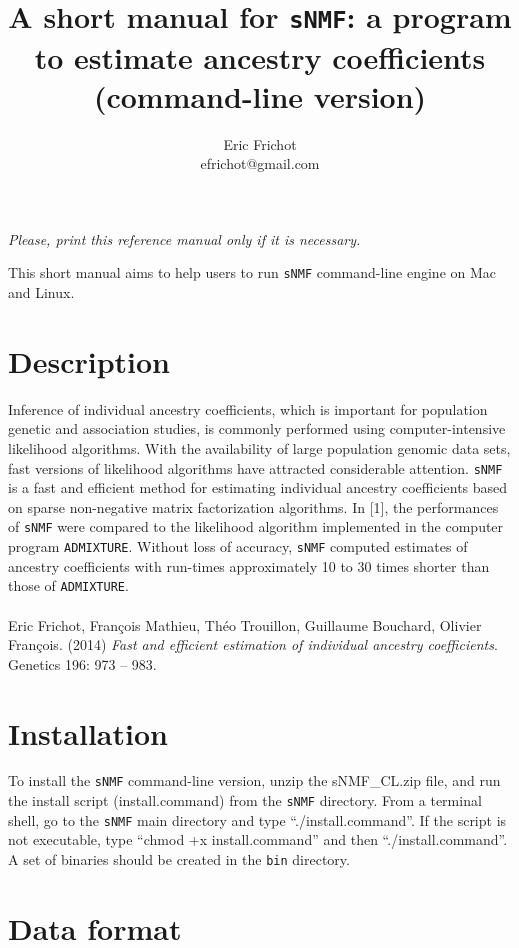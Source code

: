 \documentclass[10pt,a4paper]{article}
\title{\bf \Large A short manual for {\tt sNMF}:
a program to estimate ancestry coefficients\\
\large (command-line version)
}
\author{
        Eric Frichot\\efrichot@gmail.com\\
}
\begin{document}
\maketitle
\begin{center}
{\it Please, print this reference manual only if it is necessary.}
\end{center}

\noindent
This short manual aims to help users to run {\tt sNMF} command-line engine on Mac and Linux. 

\section{Description} 
Inference of individual ancestry coefficients, which is important for population genetic and association studies, is commonly performed using computer-intensive likelihood algorithms. With the availability of large population genomic data sets, fast versions of likelihood algorithms have attracted considerable attention. 
\noindent
{\tt sNMF} is a fast and efficient method for estimating individual ancestry coefficients based on sparse non-negative matrix factorization algorithms. In [1], the performances of {\tt sNMF} were compared to the likelihood algorithm implemented in the computer program {\tt ADMIXTURE}.  Without loss of accuracy, {\tt sNMF} computed estimates of ancestry coefficients with run-times approximately 10 to 30 times shorter than those of {\tt ADMIXTURE}.
\\
\\
\noindent
[1] Eric Frichot, François Mathieu, Théo Trouillon, Guillaume Bouchard, Olivier François. (2014) {\it Fast and efficient estimation of individual ancestry coefficients}. Genetics 196: 973 -- 983. 

\section{Installation} 

\noindent
To install the {\tt sNMF} command-line version, unzip the sNMF\_CL.zip file, and run the 
install script (install.command) from the {\tt sNMF} directory.
From a terminal shell, go to the {\tt sNMF} main directory and type ``./install.command''.
If the script is not executable, type ``chmod +x install.command'' and then ``./install.command''.
A set of binaries should be created in the {\tt bin} directory.

\section{Data format}
\end{document}

